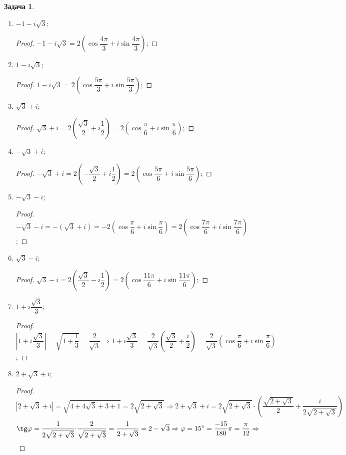 \documentclass[12pt]{article}
\theoremstyle{definition}
\newtheorem{problem}{Задача}
\begin{document}
\begin{problem}
\begin{enumerate}[label=\asbuk*)]
		\item $-1-i\sqrt{3}$;
		\begin{proof}
			$-1-i\sqrt{3} = 2\left(\cos\dfrac{4\pi}{3} + i\sin\dfrac{4\pi}{3}\right)$;
		\end{proof}
		\item $1 -i\sqrt{3}$;
		\begin{proof}
			$1 - i\sqrt{3} = 2\left(\cos\dfrac{5\pi}{3} + i\sin\dfrac{5\pi}{3}\right)$;
		\end{proof}
		\item $\sqrt{3} + i$;
		\begin{proof}
			$\sqrt{3} + i = 2\left(\dfrac{\sqrt{3}}{2} + i \dfrac{1}{2}\right) = 2\left(\cos\dfrac{\pi}{6} + i\sin\dfrac{\pi}{6}\right)$;
		\end{proof}
		\item $-\sqrt{3} + i$;
		\begin{proof}
			$-\sqrt{3} + i = 2\left(-\dfrac{\sqrt{3}}{2}+ i \dfrac{1}{2}\right) =2 \left(\cos\dfrac{5\pi}{6} + i\sin\dfrac{5\pi}{6}\right)$;
		\end{proof}
		\item $-\sqrt{3} -i$;
		\begin{proof}
			$-\sqrt{3} -i = -(\sqrt{3} + i) = -2\left(\cos\dfrac{\pi}{6} + i\sin\dfrac{\pi}{6}\right) = 2\left(\cos\dfrac{7\pi}{6} + i\sin\dfrac{7\pi}{6}\right)$;
		\end{proof}
		\item $\sqrt{3} - i$;
		\begin{proof}
			$\sqrt{3} - i = 2\left(\dfrac{\sqrt{3}}{2} - i\dfrac{1}{2}\right) = 2\left(\cos\dfrac{11\pi}{6} + i\sin\dfrac{11\pi}{6}\right)$;
		\end{proof}
		\item $1 + i\dfrac{\sqrt{3}}{3}$;
		\begin{proof}
			$\left| 1 + i\dfrac{\sqrt{3}}{3}\right| = \sqrt{1 + \dfrac{1}{3}} = \dfrac{2}{\sqrt{3}} \Rightarrow 1 + i\dfrac{\sqrt{3}}{3} = \dfrac{2}{\sqrt{3}}\left(\dfrac{\sqrt{3}}{2} + \dfrac{i}{2}\right) = \dfrac{2}{\sqrt{3}}(\cos\dfrac{\pi}{6} + i\sin\dfrac{\pi}{6})$;
		\end{proof}
		\item $2 + \sqrt{3} + i$;
		\begin{proof}
			$$
				|2 + \sqrt{3} + i| = \sqrt{4 + 4\sqrt{3} + 3 + 1} = 2\sqrt{2 + \sqrt{3}} \Rightarrow 2 + \sqrt{3} + i = 2\sqrt{2 + \sqrt{3}}{\cdot}\left(\dfrac{\sqrt{2 + \sqrt{3}}}{2} + \dfrac{i}{2\sqrt{2 + \sqrt{3}}}\right)
			$$
			$$
				\tg\varphi = \dfrac{1}{2\sqrt{2 + \sqrt{3}}}{\cdot}\dfrac{2}{\sqrt{2 + \sqrt{3}}} = \dfrac{1}{2 + \sqrt{3}} = 2 - \sqrt{3} \Rightarrow \varphi = 15^{\circ} = \dfrac{-15}{180}\pi = \dfrac{\pi}{12} \Rightarrow 
$$
\end{proof}
\end{enumerate}
\end{problem}
\end{document}
